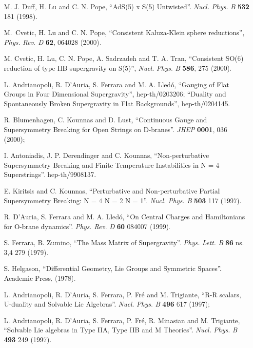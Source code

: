 \documentclass[a4paper,12pt]{article}
\begin{document}
\begin{thebibliography}{99}
M. J. Duff, H. Lu and C. N. Pope, ``AdS(5) x S(5) Untwisted''.
{\it Nucl. Phys. B} {\bf 532} 181  (1998).

M.~Cvetic, H. Lu and C. N. Pope, ``Consistent Kaluza-Klein sphere
reductions'', {\it Phys. Rev. D} {\bf 62}, 064028 (2000).


M. Cvetic, H. Lu, C. N. Pope, A. Sadrzadeh and T. A. Tran,
``Consistent SO(6) reduction of type IIB supergravity on S(5)'',
{\it Nucl.  Phys.  B}  {\bf 586}, 275 (2000).

 L. Andrianopoli, R. D'Auria, S. Ferrara and M. A. Lled\'o,
``Gauging of Flat Groups in Four Dimensional Supergravity'',
hep-th/0203206; ``Duality and Spontaneously Broken Supergravity in
Flat Backgrounds'', hep-th/0204145.




R. Blumenhagen, C. Kounnas and D. Lust, ``Continuous Gauge and
Supersymmetry Breaking for Open Strings on  D-branes''. {\it JHEP}
{\bf 0001}, 036 (2000);

I. Antoniadis, J. P. Derendinger and C. Kounnas,
``Non-perturbative Supersymmetry Breaking and Finite Temperature
Instabilities in N = 4 Superstrings''. hep-th/9908137.


 E. Kiritsis and C. Kounnas, ``Perturbative and Non-perturbative
Partial Supersymmetry Breaking:  N = 4 \myHighlight{$\to$}\coordHE{} N = 2 \myHighlight{$\to$}\coordHE{} N = 1''.
{\it Nucl. Phys. B }{\bf 503} 117 (1997).






 R. D'Auria, S. Ferrara and M. A. Lled\'o,
``On Central Charges and Hamiltonians for O-brane dynamics''. {\it Phys. Rev. D} {\bf 60}
 084007 (1999).


 S. Ferrara, B. Zumino, ``The Mass Matrix of \coordHE{} Supergravity''. {\it Phys. Lett. B} {\bf 86} ns. 3,4 279 (1979).


 S. Helgason, ``Differential Geometry, Lie Groups and Symmetric Spaces''. Academic Press, (1978).

L. Andrianopoli, R. D'Auria, S. Ferrara, P. Fr\'e and M.
Trigiante, ``R-R scalars, U-duality and Solvable Lie Algebras''.
{\it Nucl.  Phys.  B}  {\bf 496} 617 (1997);

L. Andrianopoli, R. D'Auria, S. Ferrara, P. Fr\'e, R. Minasian and
M. Trigiante, ``Solvable Lie algebras in Type IIA, Type IIB and M
Theories''. {\it Nucl. Phys. B} {\bf 493} 249 (1997).


\end{thebibliography}
\end{document}
